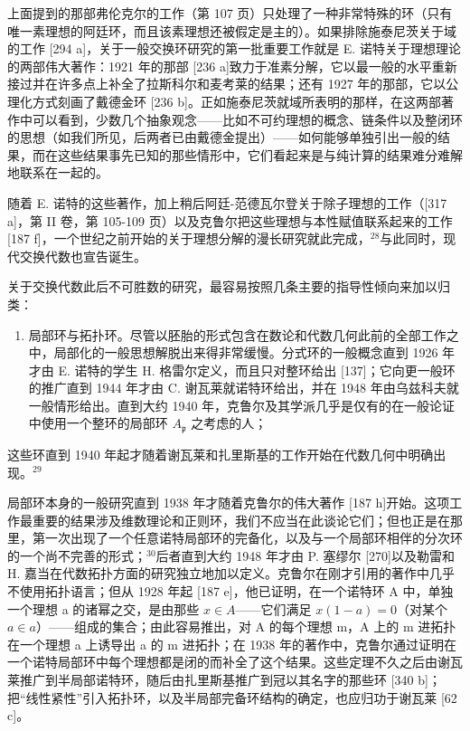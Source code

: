 上面提到的那部弗伦克尔的工作（第 107 页）只处理了一种非常特殊的环（只有唯一素理想的阿廷环，而且该素理想还被假定是主的）。如果排除施泰尼茨关于域的工作 {[}294 a{]}，关于一般交换环研究的第一批重要工作就是 E. 诺特关于理想理论的两部伟大著作：1921 年的那部 {[}236 a{]}致力于准素分解，它以最一般的水平重新接过并在许多点上补全了拉斯科尔和麦考莱的结果；还有 1927 年的那部，它以公理化方式刻画了戴德金环 {[}236 b{]}。正如施泰尼茨就域所表明的那样，在这两部著作中可以看到，少数几个抽象观念——比如不可约理想的概念、链条件以及整闭环的思想（如我们所见，后两者已由戴德金提出）——如何能够单独引出一般的结果，而在这些结果事先已知的那些情形中，它们看起来是与纯计算的结果难分难解地联系在一起的。

随着 E. 诺特的这些著作，加上稍后阿廷-范德瓦尔登关于除子理想的工作（{[}317 a{]}，第 II 卷，第 105-109 页）以及克鲁尔把这些理想与本性赋值联系起来的工作 {[}187 f{]}，一个世纪之前开始的关于理想分解的漫长研究就此完成，\(^{28}\)与此同时，现代交换代数也宣告诞生。

关于交换代数此后不可胜数的研究，最容易按照几条主要的指导性倾向来加以归类：

\begin{enumerate}
\def\labelenumi{\Alph{enumi})}
\tightlist
\item
  局部环与拓扑环。尽管以胚胎的形式包含在数论和代数几何此前的全部工作之中，局部化的一般思想解脱出来得非常缓慢。分式环的一般概念直到 1926 年才由 E. 诺特的学生 H. 格雷尔定义，而且只对整环给出 {[}137{]}；它向更一般环的推广直到 1944 年才由 C. 谢瓦莱就诺特环给出，并在 1948 年由乌兹科夫就一般情形给出。直到大约 1940 年，克鲁尔及其学派几乎是仅有的在一般论证中使用一个整环的局部环 \(A_{\mathfrak{p}}\) 之考虑的人；
\end{enumerate}

这些环直到 1940 年起才随着谢瓦莱和扎里斯基的工作开始在代数几何中明确出现。\(^{29}\)

局部环本身的一般研究直到 1938 年才随着克鲁尔的伟大著作 {[}187 h{]}开始。这项工作最重要的结果涉及维数理论和正则环，我们不应当在此谈论它们；但也正是在那里，第一次出现了一个任意诺特局部环的完备化，以及与一个局部环相伴的分次环的一个尚不完善的形式；\(^{30}\)后者直到大约 1948 年才由 P. 塞缪尔 {[}270{]}以及勒雷和 H. 嘉当在代数拓扑方面的研究独立地加以定义。克鲁尔在刚才引用的著作中几乎不使用拓扑语言；但从 1928 年起 {[}187 e{]}，他已证明，在一个诺特环 A 中，单独一个理想 a 的诸幂之交，是由那些 \(x \in A\)——它们满足 \(x(1 - a) = 0\)（对某个 \(a \in a\)）——组成的集合；由此容易推出，对 A 的每个理想 m，A 上的 m 进拓扑在一个理想 a 上诱导出 a 的 m 进拓扑；在 1938 年的著作中，克鲁尔通过证明在一个诺特局部环中每个理想都是闭的而补全了这个结果。这些定理不久之后由谢瓦莱推广到半局部诺特环，随后由扎里斯基推广到冠以其名字的那些环 {[}340 b{]}；把“线性紧性”引入拓扑环，以及半局部完备环结构的确定，也应归功于谢瓦莱 {[}62 c{]}。

